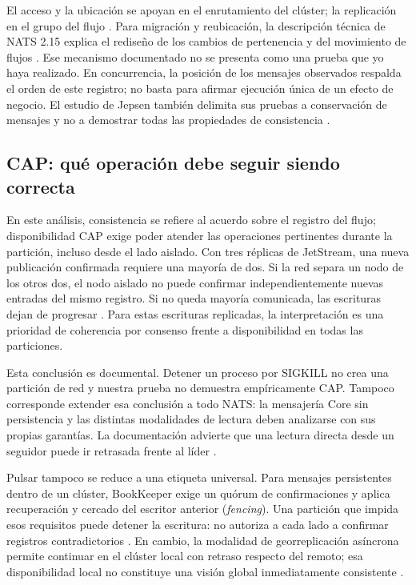 \documentclass[11pt,a4paper]{article}
\begin{document}
El acceso y la ubicación se apoyan en el enrutamiento del clúster; la replicación en el grupo del flujo \cite{natsCluster,natsReplicacion}. Para migración y reubicación, la descripción técnica de NATS 2.15 explica el rediseño de los cambios de pertenencia y del movimiento de flujos \cite{vanveen2026}. Ese mecanismo documentado no se presenta como una prueba que yo haya realizado. En concurrencia, la posición de los mensajes observados respalda el orden de este registro; no basta para afirmar ejecución única de un efecto de negocio. El estudio de Jepsen también delimita sus pruebas a conservación de mensajes y no a demostrar todas las propiedades de consistencia \cite{Kingsbury2025}.

\subsection{CAP: qué operación debe seguir siendo correcta}
En este análisis, consistencia se refiere al acuerdo sobre el registro del flujo; disponibilidad CAP exige poder atender las operaciones pertinentes durante la partición, incluso desde el lado aislado. Con tres réplicas de JetStream, una nueva publicación confirmada requiere una mayoría de dos. Si la red separa un nodo de los otros dos, el nodo aislado no puede confirmar independientemente nuevas entradas del mismo registro. Si no queda mayoría comunicada, las escrituras dejan de progresar \cite{natsCluster}. Para estas escrituras replicadas, la interpretación es una prioridad de coherencia por consenso frente a disponibilidad en todas las particiones.

Esta conclusión es documental. Detener un proceso por SIGKILL no crea una partición de red y nuestra prueba no demuestra empíricamente CAP. Tampoco corresponde extender esa conclusión a todo NATS: la mensajería Core sin persistencia y las distintas modalidades de lectura deben analizarse con sus propias garantías. La documentación advierte que una lectura directa desde un seguidor puede ir retrasada frente al líder \cite{natsReplicacion}.

Pulsar tampoco se reduce a una etiqueta universal. Para mensajes persistentes dentro de un clúster, BookKeeper exige un quórum de confirmaciones y aplica recuperación y cercado del escritor anterior (\textit{fencing}). Una partición que impida esos requisitos puede detener la escritura: no autoriza a cada lado a confirmar registros contradictorios \cite{bookkeeperProtocolo}. En cambio, la modalidad de georreplicación asíncrona permite continuar en el clúster local con retraso respecto del remoto; esa disponibilidad local no constituye una visión global inmediatamente consistente \cite{pulsarGeo}.
\end{document}
